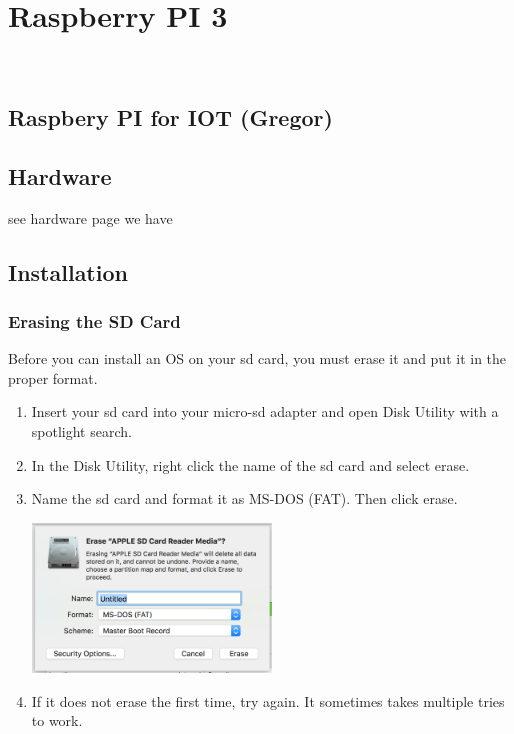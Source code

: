

\chapter{Raspberry PI 3}\label{raspberry-pi-3}

\FILENAME\

\section{Raspbery PI for IOT
(Gregor)}\label{raspbery-pi-for-iot-gregor}

\section{Hardware}\label{hardware}

see hardware page we have

\section{Installation}\label{installation}

\subsection{Erasing the SD Card}\label{erasing-the-sd-card}

Before you can install an OS on your sd card, you must erase it and put
it in the proper format.

\begin{enumerate}
\def\labelenumi{\arabic{enumi}.}

\item
  Insert your sd card into your micro-sd adapter and open Disk Utility
  with a spotlight search.
\item
  In the Disk Utility, right click the name of the sd card and select
  erase.
\item
  Name the sd card and format it as MS-DOS (FAT). Then click erase.

  \includegraphics[width=0.5\textwidth]{images/diskutil.png}

\item
  If it does not erase the first time, try again. It sometimes takes
  multiple tries to work.
\end{enumerate}

